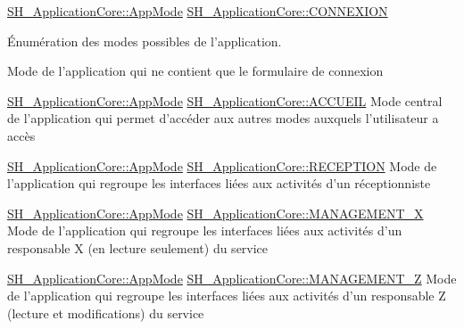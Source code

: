 \hyperlink{classSH__ApplicationCore_a6b93b2f83a290305f282616eb2935899}{S\-H\-\_\-\-Application\-Core\-::\-App\-Mode} \hyperlink{classSH__ApplicationCore_a6b93b2f83a290305f282616eb2935899a3594de687d70f634e91ef60a63b74172}{S\-H\-\_\-\-Application\-Core\-::\-C\-O\-N\-N\-E\-X\-I\-O\-N} 

Énumération des modes possibles de l'application.

Mode de l'application qui ne contient que le formulaire de connexion

\hyperlink{classSH__ApplicationCore_a6b93b2f83a290305f282616eb2935899}{S\-H\-\_\-\-Application\-Core\-::\-App\-Mode} \hyperlink{classSH__ApplicationCore_a6b93b2f83a290305f282616eb2935899a1892b908076a0887805e80f590ecdef4}{S\-H\-\_\-\-Application\-Core\-::\-A\-C\-C\-U\-E\-I\-L} Mode central de l'application qui permet d'accéder aux autres modes auxquels l'utilisateur a accès

\hyperlink{classSH__ApplicationCore_a6b93b2f83a290305f282616eb2935899}{S\-H\-\_\-\-Application\-Core\-::\-App\-Mode} \hyperlink{classSH__ApplicationCore_a6b93b2f83a290305f282616eb2935899a16687d65e8feb3b768ff655d73a45916}{S\-H\-\_\-\-Application\-Core\-::\-R\-E\-C\-E\-P\-T\-I\-O\-N} Mode de l'application qui regroupe les interfaces liées aux activités d'un réceptionniste

\hyperlink{classSH__ApplicationCore_a6b93b2f83a290305f282616eb2935899}{S\-H\-\_\-\-Application\-Core\-::\-App\-Mode} \hyperlink{classSH__ApplicationCore_a6b93b2f83a290305f282616eb2935899ae3d0d6045024cbde467f9c8cb536c6a8}{S\-H\-\_\-\-Application\-Core\-::\-M\-A\-N\-A\-G\-E\-M\-E\-N\-T\-\_\-\-X} Mode de l'application qui regroupe les interfaces liées aux activités d'un responsable X (en lecture seulement) du service

\hyperlink{classSH__ApplicationCore_a6b93b2f83a290305f282616eb2935899}{S\-H\-\_\-\-Application\-Core\-::\-App\-Mode} \hyperlink{classSH__ApplicationCore_a6b93b2f83a290305f282616eb2935899ad68aea91f508ecc6cc9fe1430ddccaf1}{S\-H\-\_\-\-Application\-Core\-::\-M\-A\-N\-A\-G\-E\-M\-E\-N\-T\-\_\-\-Z} Mode de l'application qui regroupe les interfaces liées aux activités d'un responsable Z (lecture et modifications) du service

